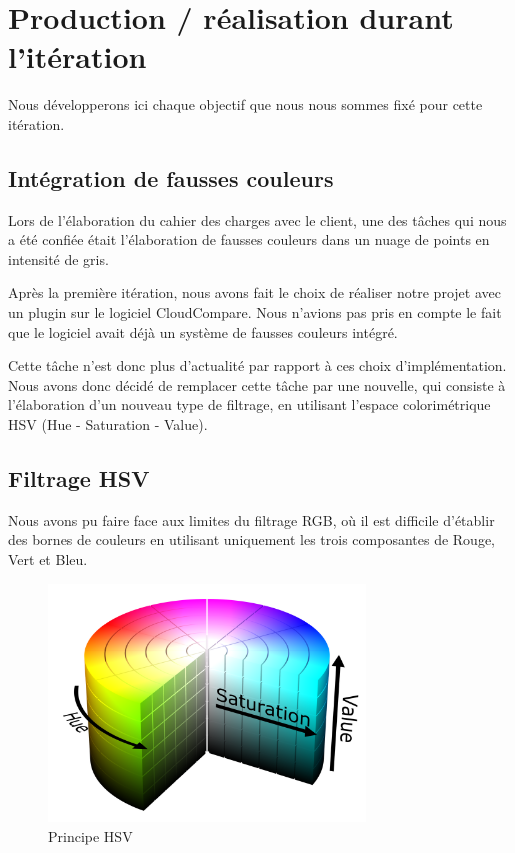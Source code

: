 \documentclass[12pt,titlepage,french]{article}
\begin{document}
\section{Production / réalisation durant l'itération}

Nous développerons ici chaque objectif que nous nous sommes fixé pour cette itération.

\subsection{Intégration de fausses couleurs}

Lors de l'élaboration du cahier des charges avec le client, une des tâches qui nous a été confiée était l'élaboration de fausses couleurs dans un nuage de points en intensité de gris. \newline

Après la première itération, nous avons fait le choix de réaliser notre projet avec un plugin sur le logiciel CloudCompare. Nous n'avions pas pris en compte le fait que le logiciel avait déjà un système de fausses couleurs intégré. \newline

Cette tâche n'est donc plus d'actualité par rapport à ces choix d'implémentation. Nous avons donc décidé de remplacer cette tâche par une nouvelle, qui consiste à l'élaboration d'un nouveau type de filtrage, en utilisant l'espace colorimétrique HSV (Hue - Saturation - Value).

\subsection{Filtrage HSV}

Nous avons pu faire face aux limites du filtrage RGB, où il est difficile d'établir des bornes de couleurs en utilisant uniquement les trois composantes de Rouge, Vert et Bleu. \newline

\begin{figure}[H]
 \caption{\label{} Principe HSV}
 \begin{center}
 \includegraphics[width=0.75\textwidth]{./img/HSV.PNG}
  \end{center}
\end{figure}
\end{document}
